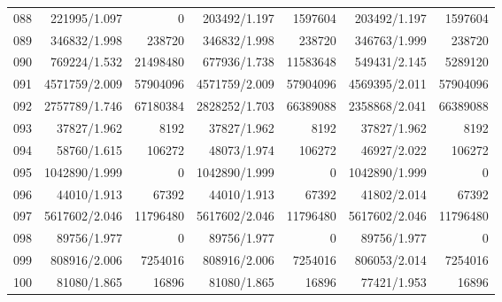 \begin{longtable}{crrrrrr}
088 & 221995/1.097 & 0 & 203492/1.197 & 1597604 & 203492/1.197 & 1597604 \\
089 & 346832/1.998 & 238720 & 346832/1.998 & 238720 & 346763/1.999 & 238720 \\
090 & 769224/1.532 & 21498480 & 677936/1.738 & 11583648 & 549431/2.145 & 5289120 \\
091 & 4571759/2.009 & 57904096 & 4571759/2.009 & 57904096 & 4569395/2.011 & 57904096 \\
092 & 2757789/1.746 & 67180384 & 2828252/1.703 & 66389088 & 2358868/2.041 & 66389088 \\
093 & 37827/1.962 & 8192 & 37827/1.962 & 8192 & 37827/1.962 & 8192 \\
094 & 58760/1.615 & 106272 & 48073/1.974 & 106272 & 46927/2.022 & 106272 \\
095 & 1042890/1.999 & 0 & 1042890/1.999 & 0 & 1042890/1.999 & 0 \\
096 & 44010/1.913 & 67392 & 44010/1.913 & 67392 & 41802/2.014 & 67392 \\
097 & 5617602/2.046 & 11796480 & 5617602/2.046 & 11796480 & 5617602/2.046 & 11796480 \\
098 & 89756/1.977 & 0 & 89756/1.977 & 0 & 89756/1.977 & 0 \\
099 & 808916/2.006 & 7254016 & 808916/2.006 & 7254016 & 806053/2.014 & 7254016 \\
100 & 81080/1.865 & 16896 & 81080/1.865 & 16896 & 77421/1.953 & 16896 \\
\end{longtable}

